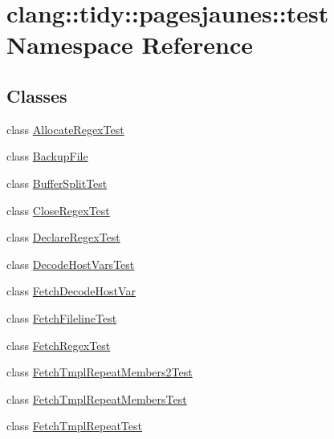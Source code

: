 \hypertarget{namespaceclang_1_1tidy_1_1pagesjaunes_1_1test}{}\section{clang\+:\+:tidy\+:\+:pagesjaunes\+:\+:test Namespace Reference}
\label{namespaceclang_1_1tidy_1_1pagesjaunes_1_1test}
\subsection*{Classes}
\begin{DoxyCompactItemize}
\item 
class \hyperlink{classclang_1_1tidy_1_1pagesjaunes_1_1test_1_1_allocate_regex_test}{Allocate\+Regex\+Test}
\item 
class \hyperlink{classclang_1_1tidy_1_1pagesjaunes_1_1test_1_1_backup_file}{Backup\+File}
\item 
class \hyperlink{classclang_1_1tidy_1_1pagesjaunes_1_1test_1_1_buffer_split_test}{Buffer\+Split\+Test}
\item 
class \hyperlink{classclang_1_1tidy_1_1pagesjaunes_1_1test_1_1_close_regex_test}{Close\+Regex\+Test}
\item 
class \hyperlink{classclang_1_1tidy_1_1pagesjaunes_1_1test_1_1_declare_regex_test}{Declare\+Regex\+Test}
\item 
class \hyperlink{classclang_1_1tidy_1_1pagesjaunes_1_1test_1_1_decode_host_vars_test}{Decode\+Host\+Vars\+Test}
\item 
class \hyperlink{classclang_1_1tidy_1_1pagesjaunes_1_1test_1_1_fetch_decode_host_var}{Fetch\+Decode\+Host\+Var}
\item 
class \hyperlink{classclang_1_1tidy_1_1pagesjaunes_1_1test_1_1_fetch_fileline_test}{Fetch\+Fileline\+Test}
\item 
class \hyperlink{classclang_1_1tidy_1_1pagesjaunes_1_1test_1_1_fetch_regex_test}{Fetch\+Regex\+Test}
\item 
class \hyperlink{classclang_1_1tidy_1_1pagesjaunes_1_1test_1_1_fetch_tmpl_repeat_members2_test}{Fetch\+Tmpl\+Repeat\+Members2\+Test}
\item 
class \hyperlink{classclang_1_1tidy_1_1pagesjaunes_1_1test_1_1_fetch_tmpl_repeat_members_test}{Fetch\+Tmpl\+Repeat\+Members\+Test}
\item 
class \hyperlink{classclang_1_1tidy_1_1pagesjaunes_1_1test_1_1_fetch_tmpl_repeat_test}{Fetch\+Tmpl\+Repeat\+Test}
\item 

\end{DoxyCompactItemize}
